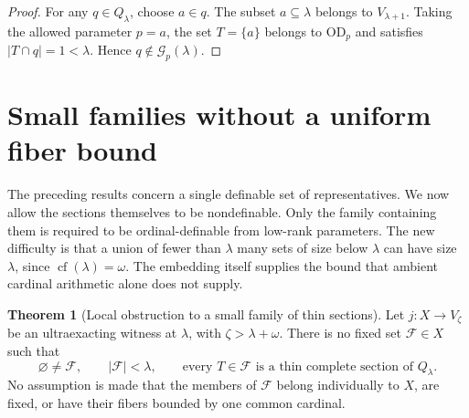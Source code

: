 \documentclass[11pt,letterpaper]{article}
\theoremstyle{definition}
\newtheorem{theorem}[definition]{Theorem}
\newcommand{\OD}{\mathrm{OD}}
\newcommand{\cf}{\operatorname{cf}}
\numberwithin{equation}{section}
\newcommand{\Good}{\mathcal G}
\begin{document}
\begin{proof}
For any $q\in Q_\lambda$, choose $a\in q$. The subset $a\subseteq\lambda$
belongs to $V_{\lambda+1}$. Taking the allowed parameter $p=a$, the set
$T=\{a\}$ belongs to $\OD_p$ and satisfies $|T\cap q|=1<\lambda$.
Hence $q\notin\Good_p(\lambda)$.
\end{proof}

\section{Small families without a uniform fiber bound}\label{sec:families}

The preceding results concern a single definable set of representatives. We
now allow the sections themselves to be nondefinable. Only the family
containing them is required to be ordinal-definable from low-rank parameters.
The new difficulty is that a union of fewer than $\lambda$ many sets of size
below $\lambda$ can have size $\lambda$, since $\cf(\lambda)=\omega$.
The embedding itself supplies the bound that ambient cardinal arithmetic
alone does not supply.

\begin{theorem}[Local obstruction to a small family of thin sections]\label{thm:local-families}
Let $j:X\to V_\zeta$ be an ultraexacting witness at $\lambda$, with
$\zeta>\lambda+\omega$. There is no fixed set $\mathcal F\in X$ such that
\[
 \varnothing\ne\mathcal F,\qquad |\mathcal F|<\lambda,
 \qquad \text{every }T\in\mathcal F\text{ is a thin complete section of }Q_\lambda.
\]
No assumption is made that the members of $\mathcal F$ belong individually to
$X$, are fixed, or have their fibers bounded by one common cardinal.
\end{theorem}
\end{document}
